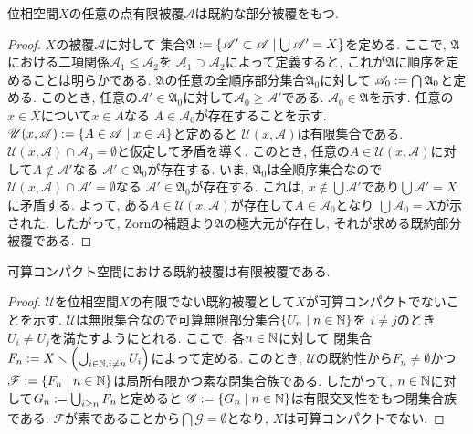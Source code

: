 \documentclass[uplatex, dvipdfmx, a4paper, 12pt, class=jsbook, crop=false]{standalone}
\begin{document}
\begin{proposition}
	\label{prop:Every point finite cover A of X has an irreducible subcover}
	位相空間$ X $の任意の点有限被覆$ \mathscr{A} $は既約な部分被覆をもつ.
\end{proposition}

\begin{proof}
	$ X $の被覆$ \mathscr{A} $に対して
	集合$ \mathfrak{A} \defeq \setcomp{\mathscr{A}' \subset \mathscr{A}}{\bigcup \mathscr{A}' = X} $を定める. 
	ここで, $ \mathfrak{A} $における二項関係$ \mathscr{A}_1 \leq \mathscr{A}_2 $を
	$ \mathscr{A}_1 \supset \mathscr{A}_2 $によって定義すると, 
	これが$ \mathfrak{A} $に順序を定めることは明らかである. 
	$ \mathfrak{A} $の任意の全順序部分集合$ \mathfrak{A}_0 $に対して
	$ \mathscr{A}_0 \mathrel{:=} \bigcap \mathfrak{A}_0 $と定める. 
	このとき, 任意の$ \mathscr{A}' \in \mathfrak{A}_0 $に対して$ \mathscr{A}_0 \geq \mathscr{A}' $である. 
	$ \mathscr{A}_0 \in \mathfrak{A} $を示す. 任意の$ x \in X $について$ x \in A $なる
	$ A \in \mathscr{A}_0 $が存在することを示す. 
	$ \mathscr{U}(x, \mathscr{A}) \defeq \setcomp{A \in \mathscr{A}}{x \in A} $と定めると
	$ \mathscr{U}(x, \mathscr{A}) $は有限集合である. 
	$ \mathscr{U}(x, \mathscr{A}) \cap \mathscr{A}_0 = \emptyset $と仮定して矛盾を導く. 
	このとき, 任意の$ A \in \mathscr{U}(x, \mathscr{A}) $に対して$ A \notin \mathscr{A}' $なる
	$ \mathscr{A}' \in \mathfrak{A}_0 $が存在する. 
	いま, $ \mathfrak{A}_0 $は全順序集合なので
	$ \mathscr{U}(x, \mathscr{A}) \cap \mathscr{A}' = \emptyset $なる
	$ \mathscr{A}' \in \mathfrak{A}_0 $が存在する. 
	これは, $ x \notin \bigcup \mathscr{A}' $であり$ \bigcup \mathscr{A}' = X $に矛盾する. 
	よって, ある$ A \in \mathscr{U}(x, \mathscr{A}) $が存在して$ A \in \mathscr{A}_0 $となり
	$ \bigcup \mathscr{A}_0 = X $が示された. したがって, Zornの補題より$ \mathfrak{A} $の極大元が存在し, 
	それが求める既約部分被覆である.
\end{proof}

\begin{proposition}
	\label{prop:Irreducible cover in a CntCpt space is a finite cover}
	可算コンパクト空間における既約被覆は有限被覆である.
\end{proposition}

\begin{proof}
	$ \mathscr{U} $を位相空間$ X $の有限でない既約被覆として$ X $が可算コンパクトでないことを示す. 
	$ \mathscr{U} $は無限集合なので可算無限部分集合$ \setcomp{U_n}{n \in \N} $を
	$ i \neq j $のとき$ U_i \neq U_j $を満たすようにとれる. ここで, 各$ n \in \mathbb{N} $に対して
	閉集合$ F_n \mathrel{:=} X \smallsetminus \left(\bigcup_{i \in \mathbb{N}, i \neq n} U_i\right) $によって定める.
	このとき, $ \mathscr{U} $の既約性から$ F_n \neq \emptyset $かつ
	$ \mathscr{F} \defeq \setcomp{F_n}{n \in \N} $は局所有限かつ素な閉集合族である.
	したがって, $ n \in \mathbb{N} $に対して$ G_n \mathrel{:=} \bigcup_{i \geq n} F_n $と定めると
	$ \mathscr{G} \defeq \setcomp{G_n}{n \in \N} $は有限交叉性をもつ閉集合族である.
	$ \mathscr{F} $が素であることから$ \bigcap \mathscr{G} = \emptyset $となり, $ X $は可算コンパクトでない.
\end{proof}
\end{document}
